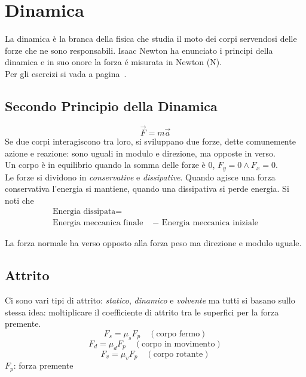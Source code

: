 
\section{Dinamica}\label{sec:dinamica}
La dinamica è la branca della fisica che studia il moto dei corpi servendosi delle forze che ne
sono responsabili. Isaac Newton ha enunciato i principi della dinamica e in suo onore la forza é 
  misurata in Newton (N).\\
Per gli esercizi si vada a pagina~\pageref{ex:dinamica}.
\subsection{Secondo Principio della Dinamica}
\begin{equation*}
\vec{F} = m\vec{a}
\end{equation*}
Se due corpi interagiscono tra loro, si sviluppano due forze, dette comunemente azione e reazione: 
sono uguali in modulo e direzione, ma opposte in verso.\\
Un corpo è in equilibrio quando la somma delle forze è 0, $F_y = 0\land F_x = 0$.\\
Le forze si dividono in \emph{conservative} e \emph{dissipative}. Quando agisce una forza conservativa
l'energia si mantiene, quando una dissipativa si perde energia. Si noti che
\begin{align*}
  \text{Energia dissipata} =&\\
  \text{Energia meccanica finale } &- \text{ Energia meccanica iniziale}
\end{align*}

\begin{center}
\end{center}
La forza normale ha verso opposto alla forza peso ma direzione e modulo uguale.

\subsection{Attrito}
Ci sono vari tipi di attrito: \emph{statico}, \emph{dinamico} e \emph{volvente} ma tutti si basano
sullo stessa idea: moltiplicare il coefficiente di attrito tra le superfici per la forza premente.
\begin{equation*}
  F_s = \mu_sF_p\quad (\text{corpo fermo})
\end{equation*}
\begin{equation*}
  F_d = \mu_dF_p\quad (\text{corpo in movimento})
\end{equation*}
\begin{equation*}
  F_v = \mu_vF_p\quad (\text{corpo rotante})
\end{equation*}
$F_p$: forza premente


